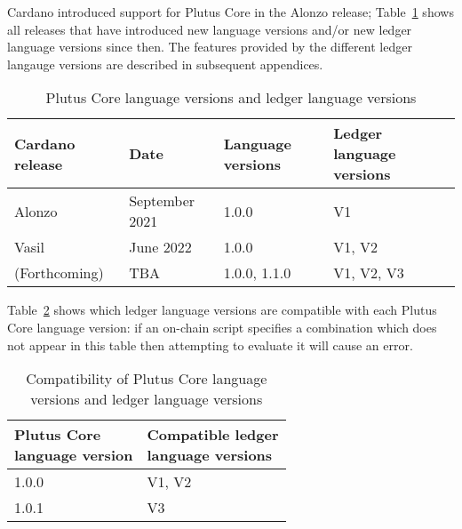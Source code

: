 Cardano introduced support for Plutus Core in the Alonzo release;
Table~\ref{table:versions} shows all releases that have introduced new language
versions and/or new ledger language versions since then.  The features provided
by the different ledger langauge versions are described in subsequent appendices.
\begin{table}[H]
  \centering
    \begin{tabular}{|l|l|l|l|}
        \hline
        Cardano release & Date & Language versions & Ledger language versions \\
        \hline
        Alonzo & September 2021 & 1.0.0 & V1 \\
        Vasil & June 2022 & 1.0.0 & V1, V2 \\
        (Forthcoming) & TBA & 1.0.0, 1.1.0 & V1, V2, V3 \\
        \hline
    \end{tabular}
    \caption{Plutus Core language versions and ledger language versions}
    \label{table:versions}
\end{table}
   

\noindent Table~\ref{table:version-dependencies} shows which ledger language
versions are compatible with each Plutus Core language version: if an on-chain
script specifies a combination which does not appear in this table then
attempting to evaluate it will cause an error.
 
\begin{table}[H]
  \centering
    \begin{tabular}{|l|l|}
        \hline
        \thead{Plutus Core \\ language version} & \thead{Compatible ledger \\ language versions}\\
        \hline
        1.0.0 & V1, V2\\
        1.0.1 & V3 \\
        \hline
    \end{tabular}
    \caption{Compatibility of Plutus Core language versions and ledger language versions}
    \label{table:version-dependencies}
\end{table}

